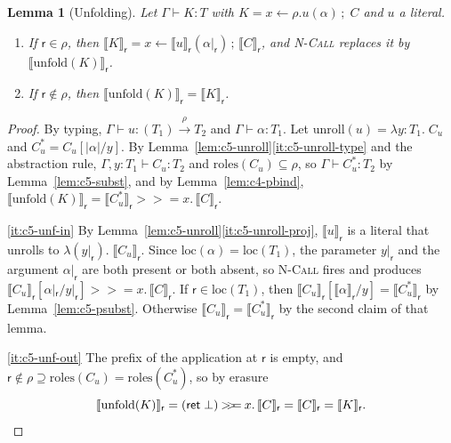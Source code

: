 \documentclass[11pt]{report}
\theoremstyle{plain}
\newtheorem{lemma}[theorem]{Lemma}
\theoremstyle{definition}
\theoremstyle{remark}
\newcommand{\kw}[1]{\mathsf{#1}}
\newcommand{\rr}{\mathsf{r}}
\newcommand{\bind}[3]{#1 \leftarrow #2\,;\;#3}
\newcommand{\mbind}[3]{#1 \mathbin{>\!\!>\!\!=} #2.\,#3}
\newcommand{\unfold}[1]{\mathrm{unfold}(#1)}
\newcommand{\roles}[1]{\mathrm{roles}(#1)}
\newcommand{\loc}[1]{\mathrm{loc}(#1)}
\newcommand{\pay}[1]{\lvert #1\rvert}
\newcommand{\proj}[2]{\llbracket #1 \rrbracket_{#2}}
\newcommand{\farr}[3]{(#1) \xrightarrow{#2} #3}
\newcommand{\clam}[3]{\lambda #1{:}#2.\;#3}
\newcommand{\nlam}[2]{\lambda(#1).\;#2}
\newcommand{\unroll}[1]{\mathrm{unroll}(#1)}
\newcommand{\rn}[1]{{\normalfont\scshape #1}}
\begin{document}
\begin{lemma}[Unfolding]\label{lem:c5-unfold}
  Let $\Gamma\vdash K:T$ with $K=\bind{x}{\rho.u(\alpha)}{C}$ and $u$ a
  literal.
  \begin{enumerate}[label=(\roman*),nosep]
  \item\label{it:c5-unf-in} If $\rr\in\rho$, then
    $\proj{K}{\rr}=x\leftarrow\proj{u}{\rr}(\alpha|_\rr)\,;\,\proj{C}{\rr}$,
    and \rn{N-Call} replaces it by $\proj{\unfold{K}}{\rr}$.
  \item\label{it:c5-unf-out} If $\rr\notin\rho$, then $\proj{\unfold{K}}{\rr}=\proj{K}{\rr}$.
  \end{enumerate}
\end{lemma}
\begin{proof}
  By typing, $\Gamma\vdash u:\farr{T_1}{\rho}{T_2}$ and
  $\Gamma\vdash\alpha:T_1$.  Let $\unroll{u}=\clam{y}{T_1}{C_u}$ and
  $C_u^\ast=C_u[\pay{\alpha}/y]$.  By
  Lemma~\ref{lem:c5-unroll}\ref{it:c5-unroll-type} and the abstraction
  rule, $\Gamma,y{:}T_1\vdash C_u:T_2$ and $\roles{C_u}\subseteq\rho$, so
  $\Gamma\vdash C_u^\ast:T_2$ by Lemma~\ref{lem:c5-subst}, and by
  Lemma~\ref{lem:c4-pbind},
  $\proj{\unfold{K}}{\rr}=\mbind{\proj{C_u^\ast}{\rr}}{x}{\proj{C}{\rr}}$.

  \ref{it:c5-unf-in} By Lemma~\ref{lem:c5-unroll}\ref{it:c5-unroll-proj},
  $\proj{u}{\rr}$ is a literal that unrolls to
  $\nlam{y|_\rr}{\proj{C_u}{\rr}}$.  Since $\loc{\alpha}=\loc{T_1}$, the
  parameter $y|_\rr$ and the argument $\alpha|_\rr$ are both present or both
  absent, so \rn{N-Call} fires and produces
  $\mbind{\proj{C_u}{\rr}[\alpha|_\rr/y|_\rr]}{x}{\proj{C}{\rr}}$.  If
  $\rr\in\loc{T_1}$, then
  $\proj{C_u}{\rr}[\proj{\alpha}{\rr}/y]=\proj{C_u^\ast}{\rr}$ by
  Lemma~\ref{lem:c5-psubst}.  Otherwise
  $\proj{C_u}{\rr}=\proj{C_u^\ast}{\rr}$ by the second claim of that lemma.

  \ref{it:c5-unf-out} The prefix of the application at $\rr$ is empty, and
  $\rr\notin\rho\supseteq\roles{C_u}=\roles{C_u^\ast}$, so by erasure
  \[
    \proj{\unfold{K}}{\rr}=\mbind{(\kw{ret}\;\bot)}{x}{\proj{C}{\rr}}=\proj{C}{\rr}=\proj{K}{\rr}.\qedhere
  \]
\end{proof}
\end{document}
